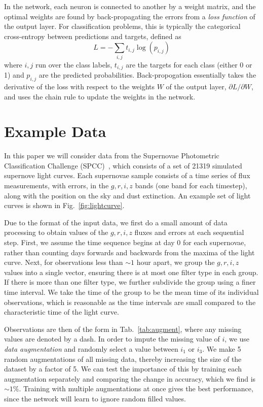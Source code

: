 \documentclass[nofootinbib,amsmath,amssymb,10pt,eqsecnum, twocolumn]{revtex4-1}
\begin{document}
 In the network, each neuron is connected to another by a weight matrix, and the optimal weights are found by back-propagating the errors from a {\em loss function} of the output layer. For classification problems, this is typically the categorical cross-entropy between predictions and targets, defined as 
\begin{equation}
L= -\sum_{i,j} t_{i,j} \log \left( p_{i,j} \right)
\end{equation}
where $i,j$ run over the class labels, $t_{i,j}$ are the targets for each class (either 0 or 1) and $p_{i,j}$ are the predicted probabilities. Back-propogation essentially takes the derivative of the loss with respect to the weights $W$ of the output layer, $\partial L/\partial W$, and uses the chain rule to update the weights in the network.

\section{Example Data}

In this paper we will consider data from the Supernovae Photometric Classification Challenge (SPCC)~\cite{Kessler:2010wk,Kessler:2010qj}, which consists of a set of 21319 simulated supernove light curves.  Each supernovae sample consists of a time series of flux measurements, with errors, in the $g, r, i, z$ bands (one band for each timestep), along with the position on the sky and dust extinction. An example set of light curves is shown in Fig.~\ref{fig:lightcurve}. 

Due to the format of the input data, we first do a small amount of data processing to obtain values of the $g, r, i, z$ fluxes and errors at each sequential step.  First, we assume the time sequence begins at day 0 for each supernovae, rather than counting days forwards and backwards from the maxima of the light curve. Next, for observations less than $\sim1$ hour apart, we group the $g, r, i, z$ values into a single vector, ensuring there is at most one filter type in each group. If there is more than one filter type, we further subdivide the group using a finer time interval.  We take the time of the group to be the mean time of its individual observations, which is reasonable as the time intervals are small compared to the characteristic time of the light curve. 

 Observations are then of the form in Tab.~\ref{tab:augment}, where any missing values are denoted by a dash. In order to impute the missing value of $i$, we use {\em data augmentation} and randomly select a value between $i_1$ or $i_3$. We make 5 random augmentations of all missing data, thereby increasing the size of the dataset by a factor of 5. We can test the importance of this by training each augmentation separately and  comparing the change in accuracy, which we find is $\sim 1\%$. Training with multiple augmentations at once gives the best performance, since the network will learn  to ignore random filled values. 
\end{document}
